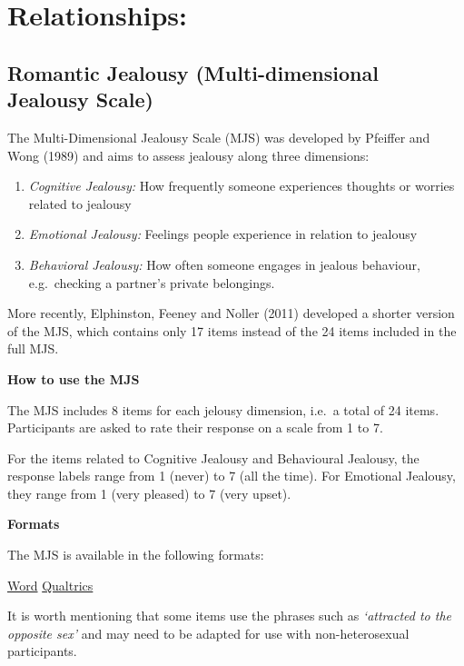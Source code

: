 \documentclass[
]{book}
\providecommand{\tightlist}{%
  \setlength{\itemsep}{0pt}\setlength{\parskip}{0pt}}
\begin{document}
\hypertarget{relationships}{%
\section{Relationships:}\label{relationships}}

\hypertarget{romantic-jealousy-multi-dimensional-jealousy-scale}{%
\subsection{Romantic Jealousy (Multi-dimensional Jealousy Scale)}\label{romantic-jealousy-multi-dimensional-jealousy-scale}}

The Multi-Dimensional Jealousy Scale (MJS) was developed by Pfeiffer and Wong (1989) and aims to assess jealousy along three dimensions:

\begin{enumerate}
\def\labelenumi{\arabic{enumi}.}
\tightlist
\item
  \emph{Cognitive Jealousy:} How frequently someone experiences thoughts or worries related to jealousy
\item
  \emph{Emotional Jealousy:} Feelings people experience in relation to jealousy
\item
  \emph{Behavioral Jealousy:} How often someone engages in jealous behaviour, e.g.~checking a partner's private belongings.
\end{enumerate}

More recently, Elphinston, Feeney and Noller (2011) developed a shorter version of the MJS, which contains only 17 items instead of the 24 items included in the full MJS.

\textbf{How to use the MJS}

The MJS includes 8 items for each jelousy dimension, i.e.~a total of 24 items. Participants are asked to rate their response on a scale from 1 to 7.

For the items related to Cognitive Jealousy and Behavioural Jealousy, the response labels range from 1 (never) to 7 (all the time). For Emotional Jealousy, they range from 1 (very pleased) to 7 (very upset).

\textbf{Formats}

The MJS is available in the following formats:

\href{link\%20to\%20file}{Word} \textbar{} \href{link\%20to\%20file}{Qualtrics}

It is worth mentioning that some items use the phrases such as \emph{`attracted to the opposite sex'} and may need to be adapted for use with non-heterosexual participants.
\end{document}
